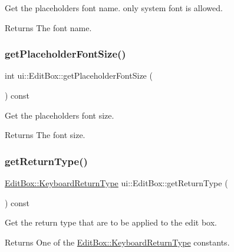 Get the placeholder\textquotesingle{}s font name. only system font is allowed. \begin{DoxyReturn}{Returns}
The font name. 
\end{DoxyReturn}
\mbox{\label{classui_1_1EditBox_aa50880b73279ba99aa23239250421e9c}} 
\subsubsection{\texorpdfstring{get\+Placeholder\+Font\+Size()}{getPlaceholderFontSize()}}
{\footnotesize\ttfamily int ui\+::\+Edit\+Box\+::get\+Placeholder\+Font\+Size (\begin{DoxyParamCaption}{ }\end{DoxyParamCaption}) const}

Get the placeholder\textquotesingle{}s font size. \begin{DoxyReturn}{Returns}
The font size. 
\end{DoxyReturn}
\mbox{\label{classui_1_1EditBox_a2c838259c0204c3cd983b0c09b59741a}} 
\subsubsection{\texorpdfstring{get\+Return\+Type()}{getReturnType()}}
{\footnotesize\ttfamily \hyperlink{classui_1_1EditBox_a1e1285b6f742975b26bdeb8108ca6e51}{Edit\+Box\+::\+Keyboard\+Return\+Type} ui\+::\+Edit\+Box\+::get\+Return\+Type (\begin{DoxyParamCaption}{ }\end{DoxyParamCaption}) const}

Get the return type that are to be applied to the edit box. \begin{DoxyReturn}{Returns}
One of the \hyperlink{classui_1_1EditBox_a1e1285b6f742975b26bdeb8108ca6e51}{Edit\+Box\+::\+Keyboard\+Return\+Type} constants. 
\end{DoxyReturn}
\mbox{\label{classui_1_1EditBox_ac510a4082911adf52395efab4bd7be83}} 
